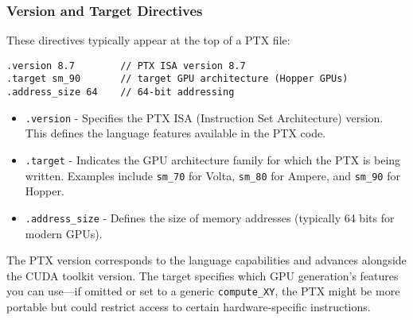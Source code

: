 \subsubsection{Version and Target Directives}

These directives typically appear at the top of a PTX file:

\begin{lstlisting}[style=ptx]
.version 8.7        // PTX ISA version 8.7
.target sm_90       // target GPU architecture (Hopper GPUs)
.address_size 64    // 64-bit addressing
\end{lstlisting}

\begin{itemize}
    \item \texttt{.version} - Specifies the PTX ISA (Instruction Set Architecture) version. This defines the language features available in the PTX code.
    
    \item \texttt{.target} - Indicates the GPU architecture family for which the PTX is being written. Examples include \texttt{sm\_70} for Volta, \texttt{sm\_80} for Ampere, and \texttt{sm\_90} for Hopper.
    
    \item \texttt{.address\_size} - Defines the size of memory addresses (typically 64 bits for modern GPUs).
\end{itemize}

The PTX version corresponds to the language capabilities and advances alongside the CUDA toolkit version. The target specifies which GPU generation's features you can use—if omitted or set to a generic \texttt{compute\_XY}, the PTX might be more portable but could restrict access to certain hardware-specific instructions.

